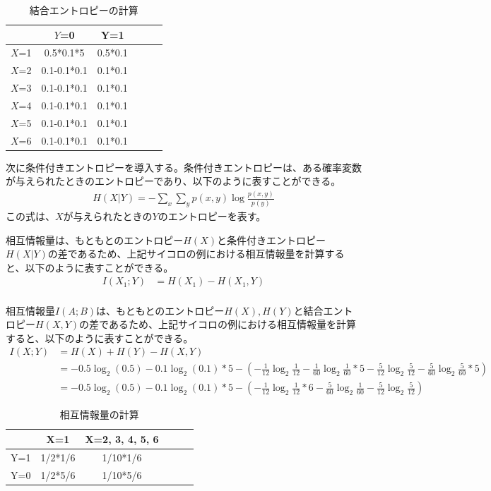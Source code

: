 \documentclass{ltjsarticle}
\begin{document}
\begin{table}[htbp]
  \centering
  \caption{結合エントロピーの計算}
  \begin{tabular}{|c|c|c|c|c|c|} \hline
     & $Y$=0 & Y=1 \\ \hline
    $X$=1 & 0.5*0.1*5 & 0.5*0.1 \\ \hline
    $X$=2 & 0.1-0.1*0.1 & 0.1*0.1 \\ \hline
    $X$=3 & 0.1-0.1*0.1 & 0.1*0.1 \\ \hline
    $X$=4 & 0.1-0.1*0.1 & 0.1*0.1 \\ \hline
    $X$=5 & 0.1-0.1*0.1 & 0.1*0.1 \\ \hline
    $X$=6 & 0.1-0.1*0.1 & 0.1*0.1 \\ \hline
  \end{tabular}
  \label{table:matrix}
\end{table}


次に条件付きエントロピーを導入する。条件付きエントロピーは、ある確率変数が与えられたときのエントロピーであり、以下のように表すことができる。
\begin{align}
  H(X|Y) = - \sum_{x} \sum_{y} p(x, y) \log \frac{p(x, y)}{p(y)}
\end{align}
この式は、$X$が与えられたときの$Y$のエントロピーを表す。

相互情報量は、もともとのエントロピー$H(X)$と条件付きエントロピー$H(X|Y)$の差であるため、上記サイコロの例における相互情報量を計算すると、以下のように表すことができる。
\begin{align}
  I(X_1; Y) &= H(X_1) - H(X_1, Y) \\
\end{align}

相互情報量$I(A;B)$は、もともとのエントロピー$H(X), H(Y)$と結合エントロピー$H(X, Y)$の差であるため、上記サイコロの例における相互情報量を計算すると、以下のように表すことができる。
\begin{align}
  I(X; Y) &= H(X) + H(Y) - H(X, Y) \\
  &= -0.5\log_{2}(0.5) - 0.1\log_{2}(0.1) * 5 -( -\frac{1}{12}\log_{2} \frac{1}{12} - \frac{1}{60}\log_{2} \frac{1}{60} * 5 - \frac{5}{12}\log_{2} \frac{5}{12} - \frac{5}{60}\log_{2} \frac{5}{60} * 5)\\
  &= -0.5\log_{2}(0.5) - 0.1\log_{2}(0.1) * 5 - ( -\frac{1}{12}\log_{2} \frac{1}{12} * 6 - \frac{5}{60}\log_{2} \frac{1}{60} - \frac{5}{12}\log_{2} \frac{5}{12} )
\end{align}

\begin{table}[htbp]
  \centering
  \caption{相互情報量の計算}
  \begin{tabular}{|c|c|c|c|c|c|} \hline
     & X=1 & X=2, 3, 4, 5, 6 \\ \hline
    Y=1 & 1/2*1/6 & 1/10*1/6 \\ \hline
    Y=0 & 1/2*5/6 & 1/10*5/6 \\ \hline
  \end{tabular}
\end{table}
\fi
\end{document}
